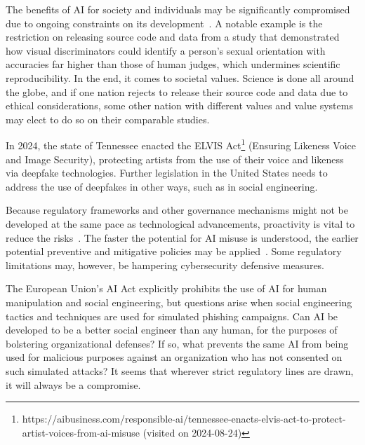 The benefits of AI for society and individuals may be significantly compromised due to ongoing constraints on its development~\citep{king_AI_Crime_Interdisciplinary_Analysis_2019}. A notable example is the restriction on releasing source code and data from a study that demonstrated how visual discriminators could identify a person's sexual orientation with accuracies far higher than those of human judges, which undermines scientific reproducibility. In the end, it comes to societal values. Science is done all around the globe, and if one nation rejects to release their source code and data due to ethical considerations, some other nation with different values and value systems may elect to do so on their comparable studies.

In 2024, the state of Tennessee enacted the ELVIS Act\footnote{https://aibusiness.com/responsible-ai/tennessee-enacts-elvis-act-to-protect-artist-voices-from-ai-misuse (visited on 2024-08-24)} (Ensuring Likeness Voice and Image Security), protecting artists from the use of their voice and likeness via deepfake technologies. Further legislation in the United States needs to address the use of deepfakes in other ways, such as in social engineering.

Because regulatory frameworks and other governance mechanisms might not be developed at the same pace as technological advancements, proactivity is vital to reduce the risks~\citep{blauth_AI_Crime_Overview_Malicious_Use_Abuse_2022}. The faster the potential for AI misuse is understood, the earlier potential preventive and mitigative policies may be applied~\citep{king_AI_Crime_Interdisciplinary_Analysis_2019}. Some regulatory limitations may, however, be hampering cybersecurity defensive measures.

The European Union’s AI Act explicitly prohibits the use of AI for human manipulation and social engineering, but questions arise when social engineering tactics and techniques are used for simulated phishing campaigns. Can AI be developed to be a better social engineer than any human, for the purposes of bolstering organizational defenses? If so, what prevents the same AI from being used for malicious purposes against an organization who has not consented on such simulated attacks? It seems that wherever strict regulatory lines are drawn, it will always be a compromise.
